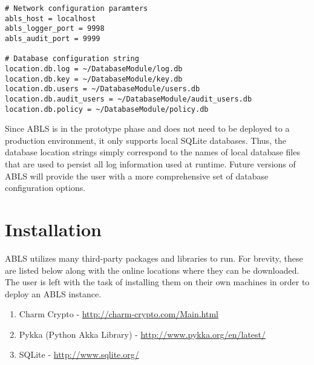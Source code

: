 \begin{lstlisting}
# Network configuration paramters
abls_host = localhost
abls_logger_port = 9998
abls_audit_port = 9999

# Database configuration string
location.db.log = ~/DatabaseModule/log.db
location.db.key = ~/DatabaseModule/key.db
location.db.users = ~/DatabaseModule/users.db
location.db.audit_users = ~/DatabaseModule/audit_users.db
location.db.policy = ~/DatabaseModule/policy.db
\end{lstlisting}

Since ABLS is in the prototype phase and does not need to be deployed to a production environment, it only 
supports local SQLite databases. Thus, the database location strings simply correspond to the names of 
local database files that are used to persist all log information used at runtime. Future versions of ABLS will 
provide the user with a more comprehensive set of database configuration options.


\section{Installation}

ABLS utilizes many third-party packages and libraries to run. For brevity, these are listed below
along with the online locations where they can be downloaded. The user is left with the task of 
installing them on their own machines in order to deploy an ABLS instance.

\begin{enumerate}
	\item Charm Crypto - \url{http://charm-crypto.com/Main.html}
	\item Pykka (Python Akka Library) - \url{http://www.pykka.org/en/latest/}
	\item SQLite - \url{http://www.sqlite.org/}
\end{enumerate}

